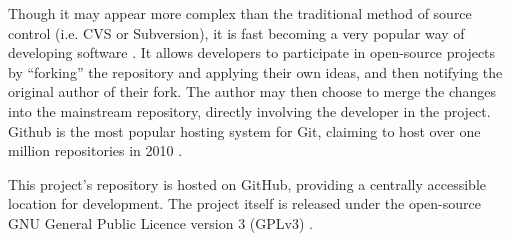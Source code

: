 Though it may appear more complex than the traditional method of source control
(i.e. CVS or Subversion), it is fast becoming a very popular way of developing
software \cite{takhteyev2010}. It allows developers to participate in
open-source projects by ``forking'' the repository and applying their own
ideas, and then notifying the original author of their fork. The author may
then choose to merge the changes into the mainstream repository, directly
involving the developer in the project. Github \cite{Github} is the most
popular hosting system for Git, claiming to host over one million repositories
in 2010 \cite{takhteyev2010}.

This project's repository is hosted on GitHub, providing a centrally accessible
location for development. The project itself is released under the open-source
GNU General Public Licence version 3 (GPLv3) \cite{stallman1991}.
